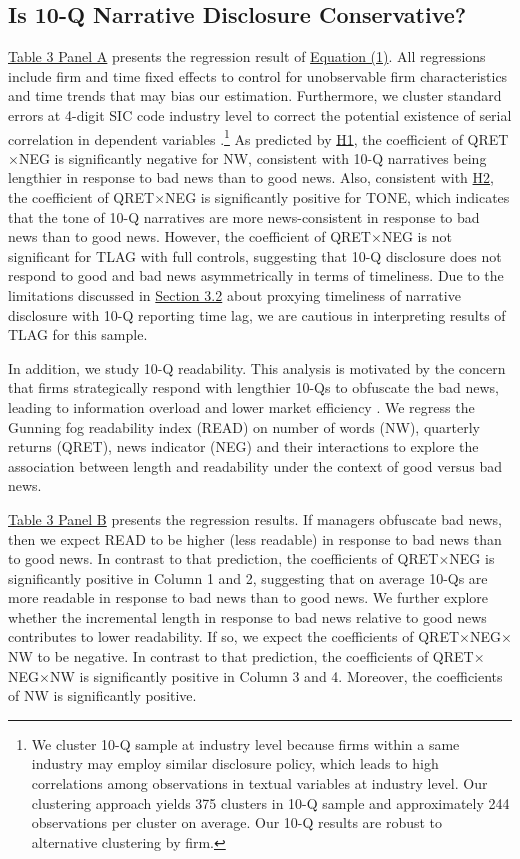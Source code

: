 \documentclass[letterpaper,11pt]{article}
\begin{document}
\begin{spacing}{1.5}
\subsection{Is 10-Q Narrative Disclosure Conservative?}
\noindent \hyperref[T3PA]{Table 3 Panel A} presents the regression result of \hyperref[eq1]{Equation (1)}. All regressions include firm and time fixed effects to control for unobservable firm characteristics and time trends that may bias our estimation. Furthermore, we cluster standard errors at 4-digit SIC code industry level to correct the potential existence of serial correlation in dependent variables \cite{petersenEstimatingStandardErrors2009}.\footnote{We cluster 10-Q sample at industry level because firms within a same industry may employ similar disclosure policy, which leads to high correlations among observations in textual variables at industry level. Our clustering approach yields 375 clusters in 10-Q sample and approximately 244 observations per cluster on average. Our 10-Q results are robust to alternative clustering by firm. } As predicted by \hyperref[h1]{H1}, the coefficient of QRET$\times$NEG is significantly negative for NW, consistent with 10-Q narratives being lengthier in response to bad news than to good news. Also, consistent with \hyperref[h2]{H2}, the coefficient of QRET$\times$NEG is significantly positive for TONE, which indicates that the tone of 10-Q narratives are more news-consistent in response to bad news than to good news. However, the coefficient of QRET$\times$NEG is not significant for TLAG with full controls, suggesting that 10-Q disclosure does not respond to good and bad news asymmetrically in terms of timeliness. Due to the limitations discussed in \hyperref[sec3.2]{Section 3.2} about proxying timeliness of narrative disclosure with 10-Q reporting time lag, we are cautious in interpreting results of TLAG for this sample.

In addition, we study 10-Q readability. This analysis is motivated by the concern that firms strategically respond with lengthier 10-Qs to obfuscate the bad news, leading to information overload and lower market efficiency \cite{chapmanInformationOverloadDisclosure2019}. We regress the Gunning fog readability index (READ) on number of words (NW), quarterly returns (QRET), news indicator (NEG) and their interactions to explore the association between length and readability under the context of good versus bad news.

\hyperref[T3PB]{Table 3 Panel B} presents the regression results. If managers obfuscate bad news, then we expect READ to be higher (less readable) in response to bad news than to good news. In contrast to that prediction, the coefficients of QRET$\times$NEG is significantly positive in Column 1 and 2, suggesting that on average 10-Qs are more readable in response to bad news than to good news. We further explore whether the incremental length in response to bad news relative to good news contributes to lower readability. If so, we expect the coefficients of QRET$\times$NEG$\times$NW to be negative. In contrast to that prediction, the coefficients of QRET$\times$NEG$\times$NW is significantly positive in Column 3 and 4. Moreover, the coefficients of NW is significantly positive. 


\end{spacing}
\end{document}
